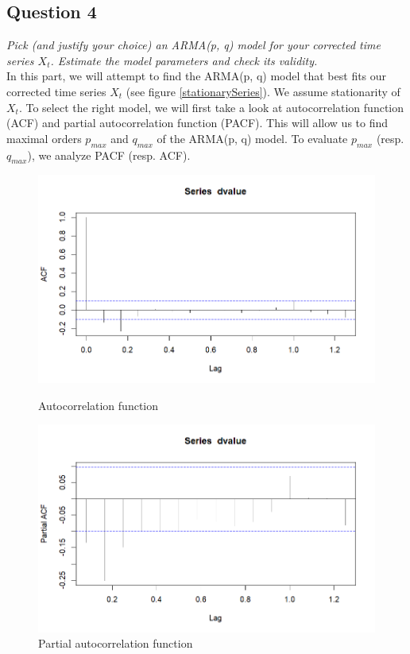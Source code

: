 \documentclass[]{article}
\begin{document}
\subsection{Question 4}
\textit{Pick (and justify your choice) an ARMA(p, q) model for your corrected time series $X_t$. Estimate the model parameters and check its validity.}\\

In this part, we will attempt to find the ARMA(p, q) model that best fits our corrected time series $X_t$ (see figure \ref{stationarySeries}). We assume stationarity of $X_t$. To select the right model, we will first take a look at autocorrelation function (ACF) and partial autocorrelation function (PACF). This will allow us to find maximal orders $p_{max}$ and $q_{max}$ of the ARMA(p, q) model. To evaluate $p_{max}$ (resp. $q_{max}$), we analyze PACF (resp. ACF).
\begin{figure}[!h]
	\centering
	\begin{minipage}{0.45 \linewidth}
		\centering
		\includegraphics[scale=0.4]{ACF.png}
		\caption{Autocorrelation function}
		\label{ACFplot}
	\end{minipage}
	\hfill
	\begin{minipage}{0.48 \linewidth}
		\centering
		\includegraphics[scale=0.4]{PACF.png}
		\caption{Partial autocorrelation function}
		\label{PACFplot}
	\end{minipage}
\end{figure}
\end{document}
